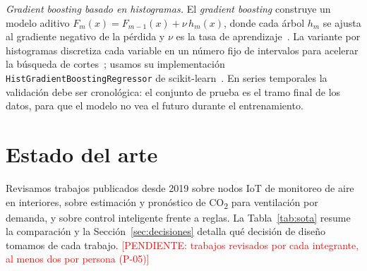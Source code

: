 \documentclass[manuscript,screen,nonacm,natbib=false]{acmart}
\newcommand{\pendiente}[1]{\textcolor{red}{[PENDIENTE: #1]}}
\newcommand{\COdos}{CO\textsubscript{2}}
\begin{document}
\textit{Gradient boosting basado en histogramas.} El \textit{gradient boosting} construye un modelo aditivo $F_m(x) = F_{m-1}(x) + \nu\,h_m(x)$, donde cada árbol $h_m$ se ajusta al gradiente negativo de la pérdida y $\nu$ es la tasa de aprendizaje~\cite{friedman2001greedy}. La variante por histogramas discretiza cada variable en un número fijo de intervalos para acelerar la búsqueda de cortes~\cite{ke2017lightgbm}; usamos su implementación \texttt{HistGradientBoostingRegressor} de scikit-learn~\cite{pedregosa2011scikit}. En series temporales la validación debe ser cronológica: el conjunto de prueba es el tramo final de los datos, para que el modelo no vea el futuro durante el entrenamiento.

\FloatBarrier
\section{Estado del arte}
\label{sec:sota}
Revisamos trabajos publicados desde 2019 sobre nodos IoT de monitoreo de aire en interiores, sobre estimación y pronóstico de \COdos{} para ventilación por demanda, y sobre control inteligente frente a reglas. La Tabla~\ref{tab:sota} resume la comparación y la Sección~\ref{sec:decisiones} detalla qué decisión de diseño tomamos de cada trabajo. \pendiente{trabajos revisados por cada integrante, al menos dos por persona (P-05)}
\end{document}

